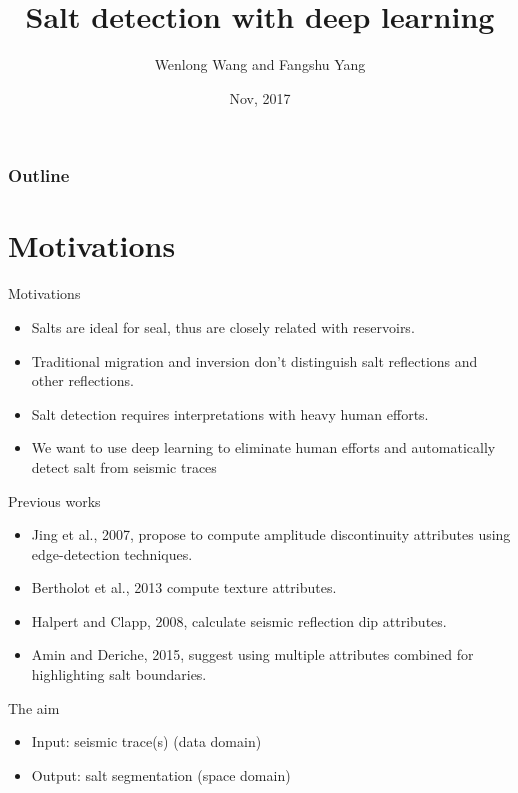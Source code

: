 \documentclass[aspectratio=43]{beamer}
\title[Salt]{Salt detection with deep learning}
\author[W. Wang]{Wenlong Wang and Fangshu Yang}
\institute[HIT]{Harbin Institute of Technology}
\date[Nov 2017]{Nov, 2017}
\begin{document}



\begin{frame}[plain]
  \titlepage
\end{frame}

\begin{frame}
\frametitle{Outline}
\tableofcontents
\end{frame}
\section{Motivations}
\begin{frame}{Motivations}
\begin{itemize}
\item{Salts are ideal for seal, thus are closely related with reservoirs.}
\item{Traditional migration and inversion don't distinguish salt reflections and other reflections.}
\item{Salt detection requires interpretations with heavy human efforts.}
\item{We want to use deep learning to eliminate human efforts and automatically detect salt from seismic traces}
\end{itemize}
\end{frame}
\begin{frame}{Previous works}
\begin{itemize}
\item{Jing et al., 2007, propose to compute amplitude discontinuity attributes using edge-detection techniques.}
\item{Bertholot et al., 2013 compute texture attributes.}
\item{Halpert and Clapp, 2008, calculate seismic reflection dip attributes.}
\item{Amin and Deriche, 2015, suggest using multiple attributes combined for highlighting salt boundaries.} 
\end{itemize}
\end{frame}
\begin{frame}{The aim}
\begin{itemize}
\item{Input: seismic trace(s) (data domain)}
\item{Output: salt segmentation (space domain)}
\end{itemize}
\end{frame}
\end{document}
